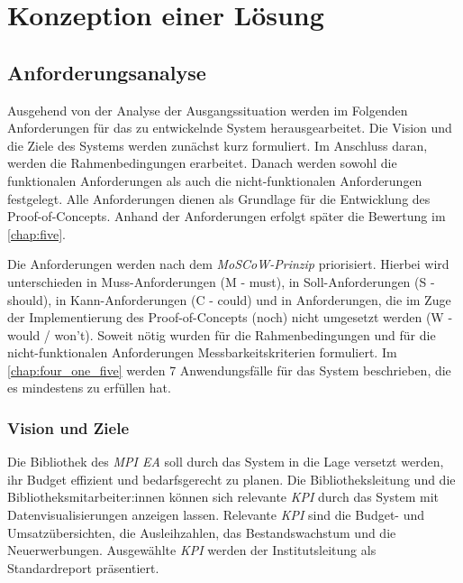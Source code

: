 \chapter{Konzeption einer Lösung}
\label{chap:four}

\section{Anforderungsanalyse}
Ausgehend von der Analyse der Ausgangssituation werden im Folgenden 
Anforderungen für das zu entwickelnde System herausgearbeitet. Die Vision und die Ziele des Systems werden zunächst kurz formuliert. Im Anschluss daran,
werden die Rahmenbedingungen erarbeitet. Danach werden sowohl die funktionalen Anforderungen als
auch die nicht-funktionalen Anforderungen festgelegt. Alle Anforderungen dienen als Grundlage für die Entwicklung des Proof-of-Concepts. 
Anhand der Anforderungen erfolgt später die Bewertung im \autoref{chap:five}.


Die Anforderungen werden nach dem \textit{MoSCoW-Prinzip} priorisiert. 
Hierbei wird unterschieden in Muss-Anforderungen (M - must), in Soll-Anforderungen (S - should), in Kann-Anforderungen (C - could) und in Anforderungen,
die im Zuge der Implementierung des Proof-of-Concepts (noch) nicht umgesetzt werden (W - would / won't).
Soweit nötig wurden für die Rahmenbedingungen und für die nicht-funktionalen Anforderungen Messbarkeitskriterien formuliert. 
Im \autoref{chap:four_one_five} werden 7 Anwendungsfälle für das System beschrieben, die es mindestens zu erfüllen hat.

\subsection{Vision und Ziele}
Die Bibliothek des \textit{\acrshort{MPI EA}} soll durch das System in die Lage versetzt werden, ihr Budget effizient und bedarfsgerecht zu planen.
Die Bibliotheksleitung und die Bibliotheksmitarbeiter:innen können sich relevante \textit{\acrlong{KPI}} durch das System mit
Datenvisualisierungen anzeigen lassen. Relevante \textit{\acrshort{KPI}} sind die Budget- und Umsatzübersichten, die Ausleihzahlen, das Bestandswachstum und die
Neuerwerbungen. 
Ausgewählte \textit{\acrshort{KPI}} werden der Institutsleitung als Standardreport präsentiert.

